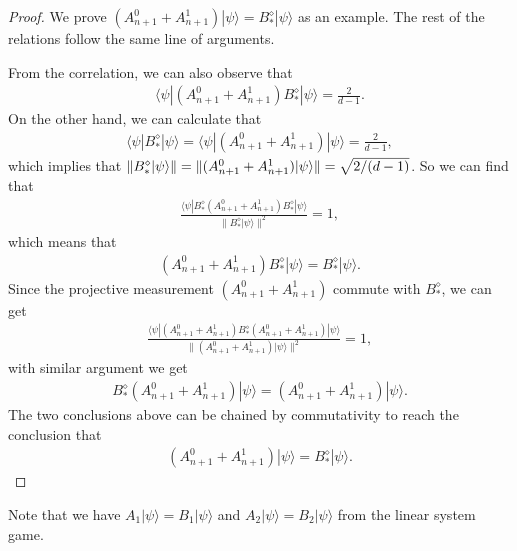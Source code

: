 \documentclass[11pt,letterpaper]{article}
\newcommand{\ket}[1]{|#1\rangle}
\newcommand{\bra}[1]{\langle#1|}
\DeclarePairedDelimiter{\norm}{\lVert}{\rVert}
\DeclareMathOperator{\supp}{supp}
\newcommand{\1}{\mathbb{1}}
\theoremstyle{definition}
\begin{document}
\begin{proof} 
We prove $(A_{n+1}^0+A_{n+1}^1)\ket{\psi} = B_\ast^\diamond \ket{\psi}$ as an example.
The rest of the relations follow the same line of arguments.

From the correlation, we can also observe that
\begin{align}
 \bra{\psi} (A_{n+1}^0+A_{n+1}^1)B_\ast^\diamond \ket{\psi} = \frac{2}{d-1}.
\end{align}
On the other hand, we can calculate that 
\begin{align}
	\bra{\psi} B_\ast^\diamond \ket{\psi} = \bra{\psi}(A_{n+1}^0+A_{n+1}^1)\ket{\psi} = \frac{2}{d-1},
\end{align}
which implies that $\norm{ B_\ast^\diamond \ket{\psi} }= \norm{ (A_{n+1}^0+A_{n+1}^1) \ket{\psi}} = \sqrt{2/(d-1)}$.
So we can find that 
\begin{align}
	\frac{\bra{\psi}B_\ast^\diamond (A_{n+1}^0+A_{n+1}^1) B_\ast^\diamond\ket{\psi}}{ \| B_\ast^\diamond \ket{\psi} \|^2} = 1,
\end{align}
which means that 
\begin{align}
	(A_{n+1}^0+A_{n+1}^1)B_\ast^\diamond \ket{\psi} = B_\ast^\diamond \ket{\psi}.
\end{align}
Since the projective measurement $(A_{n+1}^0+A_{n+1}^1)$ commute with $B_\ast^\diamond$, we can get
\begin{align}
	\frac{\bra{\psi} (A_{n+1}^0+A_{n+1}^1) B_\ast^\diamond(A_{n+1}^0+A_{n+1}^1)\ket{\psi}}{ \| (A_{n+1}^0+A_{n+1}^1) \ket{\psi} \|^2} = 1,
\end{align}
with similar argument we get 
\begin{align}
	B_\ast^\diamond (A_{n+1}^0+A_{n+1}^1) \ket{\psi} = (A_{n+1}^0+A_{n+1}^1)\ket{\psi}.
\end{align}
The two conclusions above can be chained by commutativity to reach the conclusion that 
\begin{align}
	(A_{n+1}^0+A_{n+1}^1)\ket{\psi} = B_\ast^\diamond \ket{\psi}.
\end{align}
\end{proof}
Note that we have $A_1 \ket{\psi} = B_1 \ket{\psi}$ and $A_2 \ket{\psi} = B_2 \ket{\psi}$ from the linear
system game.
\end{document}
